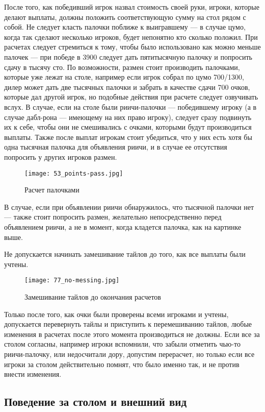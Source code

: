 После того, как победивший игрок назвал стоимость своей руки, игроки, которые делают выплаты, должны положить соответствующую сумму на стол рядом с собой. Не следует класть палочки поближе к выигравшему --- в случае цумо, когда так сделают несколько игроков, будет непонятно кто сколько положил. При расчетах следует стремиться к тому, чтобы было использовано как можно меньше палочек --- при победе в 3900 следует дать пятитысячную палочку и попросить сдачу в тысячу сто. По возможности, размен стоит производить палочками, которые уже лежат на столе, например если игрок собрал по цумо 700/1300, дилер может дать две тысячных палочки и забрать в качестве сдачи 700 очков, которые дал другой игрок, но подобные действия при расчете следует озвучивать вслух. В случае, если на столе были риичи-палочки --- победившему игроку (а в случае дабл-рона --- имеющему на них право игроку), следует сразу подвинуть их к себе, чтобы они не смешивались с очками, которыми будут производиться выплаты. Также после выплат игрокам стоит убедиться, что у них есть хотя бы одна тысячная палочка для объявления риичи, и в случае ее отсутствия попросить у других игроков размен.

\begin{figure}[H]
	\centering
	\texttt{[image: 53\_points-pass.jpg]}
	\caption{Расчет палочками}
\end{figure}

В случае, если при объявлении риичи обнаружилось, что тысячной палочки нет --- также стоит попросить размен, желательно непосредственно перед объявлением риичи, а не в момент, когда кладется палочка, как на картинке выше.

Не допускается начинать замешивание тайлов до того, как все выплаты были учтены.

\begin{figure}[H]
	\centering
	\texttt{[image: 77\_no-messing.jpg]}
	\caption{Замешивание тайлов до окончания расчетов}
\end{figure}

Только после того, как очки были проверены всеми игроками и учтены, допускается перевернуть тайлы и приступить к перемешиванию тайлов, любые изменения в расчетах после этого момента производиться не должны. Если все за столом согласны, например игроки вспомнили, что забыли отметить чью-то риичи-палочку, или недосчитали дору, допустим перерасчет, но только если все игроки за столом действительно помнят, что было именно так, и не против внести изменения.

\subsection{Поведение за столом и внешний вид}

